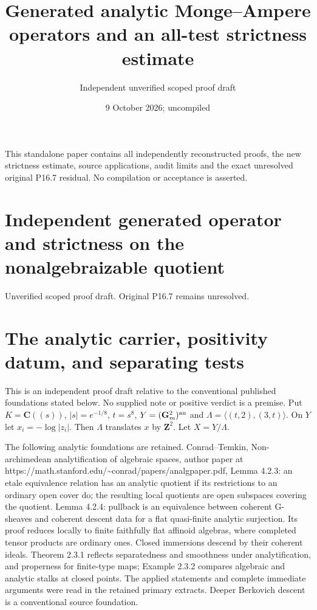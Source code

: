 \documentclass[11pt]{article}
\title{Generated analytic Monge--Ampere operators and an all-test strictness estimate}
\author{Independent unverified scoped proof draft}
\date{9 October 2026; uncompiled}
\begin{document}
\maketitle
This standalone paper contains all independently reconstructed proofs,
the new strictness estimate, source applications, audit limits and the
exact unresolved original P16.7 residual. No compilation or acceptance
is asserted.
\section*{Independent generated operator and strictness on the nonalgebraizable quotient}

Unverified scoped proof draft. Original P16.7 remains unresolved.

\section*{The analytic carrier, positivity datum, and separating tests}

This is an independent proof draft relative to the conventional published foundations stated below. No supplied note or positive verdict is a premise. Put $K=\mathbf C((s))$, $|s|=e^{-1/8}$, $t=s^8$, $Y=(\mathbf G_m^2)^{\rm an}$ and $\Lambda=\langle(t,2),(3,t)\rangle$. On $Y$ let $x_i=-\log|z_i|$. Then $\Lambda$ translates $x$ by $\mathbf Z^2$. Let $X=Y/\Lambda$.

The following analytic foundations are retained. Conrad--Temkin, Non-archimedean analytification of algebraic spaces, author paper at https://math.stanford.edu/\textasciitilde{}conrad/papers/analgpaper.pdf, Lemma 4.2.3: an etale equivalence relation has an analytic quotient if its restrictions to an ordinary open cover do; the resulting local quotients are open subspaces covering the quotient. Lemma 4.2.4: pullback is an equivalence between coherent G-sheaves and coherent descent data for a flat quasi-finite analytic surjection. Its proof reduces locally to finite faithfully flat affinoid algebras, where completed tensor products are ordinary ones. Closed immersions descend by their coherent ideals. Theorem 2.3.1 reflects separatedness and smoothness under analytification, and properness for finite-type maps; Example 2.3.2 compares algebraic and analytic stalks at closed points. The applied statements and complete immediate arguments were read in the retained primary extracts. Deeper Berkovich descent is a conventional source foundation.
\end{document}
